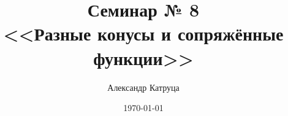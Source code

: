 \documentclass[12pt]{article}
\newtheorem{Def}{Определение}
\begin{document}
\title{Семинар № 8 \\ 
<<Разные конусы и сопряжённые функции>>}
\author{Александр Катруца}
\date{\today}
\maketitle

\end{document}
